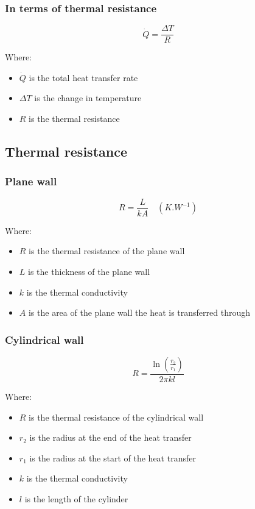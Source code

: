 \documentclass[11pt]{article}
\begin{document}
\subsubsection{In terms of thermal resistance}
\label{sec:org0521332}
\[\dot{Q} = \frac{\Delta T}{R}\]

Where:
\begin{itemize}
\item \(\dot{Q}\) is the total heat transfer rate
\item \(\Delta T\) is the change in temperature
\item \(R\) is the thermal resistance
\end{itemize}

\subsection{Thermal resistance}
\label{sec:org657cab6}

\subsubsection{Plane wall}
\label{sec:org2e7fec0}
\[R = \frac{L}{kA} \quad (\unit{K.W^{-1}})\]

Where:
\begin{itemize}
\item \(R\) is the thermal resistance of the plane wall
\item \(L\) is the thickness of the plane wall
\item \(k\) is the thermal conductivity
\item \(A\) is the area of the plane wall the heat is transferred through
\end{itemize}

\subsubsection{Cylindrical wall}
\label{sec:org6057a10}
\[R = \frac{\ln \left(\frac{r_2}{r_1} \right)}{2 \pi k l}\]

Where:
\begin{itemize}
\item \(R\) is the thermal resistance of the cylindrical wall
\item \(r_2\) is the radius at the end of the heat transfer
\item \(r_1\) is the radius at the start of the heat transfer
\item \(k\) is the thermal conductivity
\item \(l\) is the length of the cylinder
\end{itemize}
\end{document}
